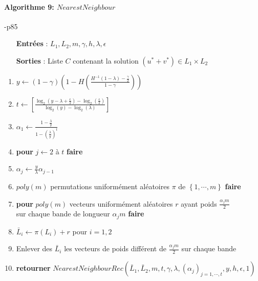 \documentclass[12pt,openany]{report}
\begin{document}
\begin{center}
\begin{boxedminipage}[ poslb ]{15cm}

\paragraph{Algorithme 9: $NearestNeighbour $ }\cite{Ghazal}-p85\\

\begin{itemize}
\item[\textbf{Entrées}]: $ L_1,L_2,m,\gamma,h,\lambda,\epsilon $
\item[\textbf{Sorties}]: Liste $ \mathit{C} $ contenant la solution $(u^{*}+ v^{*}) \in L_1 \times L_2  $
\end{itemize}

\begin{enumerate}
\item $ y \gets (1- \gamma)\left( 1- H \left( \frac{H^{-1}(1-\lambda)-\frac{\gamma}{2}}{1-\gamma}  \right) \right)   $

\item $ t \gets \left[ \frac{\log_2(y-\lambda+\frac{\epsilon}{2})-\log_2(\frac{\epsilon}{2})}{\log_2(y)-\log_2(\lambda)}   \right]  $
\item $ \alpha_1 \gets \frac{1-\frac{\lambda}{y}}{1-(\frac{\lambda}{y})^t}  $
\item \textbf{pour} $ j \gets 2 $ à $t$ \textbf{faire}
\item $ \alpha_j \gets \frac{y}{\lambda}\alpha_{j-1}  $
\item $ poly(m) $ permutations uniformément aléatoires  $ \pi $ de $ \left\lbrace  1,\cdots,m \right\rbrace  $ \textbf{faire}
\item \textbf{pour} $poly(m) $ vecteurs uniformément aléatoires $r$ ayant poids $  \frac{\alpha_j m}{2}$ \\ sur chaque bande de longueur $ \alpha_j m $ \textbf{faire}
\item $ \bar{L}_i \gets \pi(L_i)+r $ pour $ i=1,2 $
\item Enlever des $ \bar{L}_i $ les vecteurs de poids différent de $  \frac{\alpha_j m}{2}$ sur chaque bande
\item \textbf{retourner} $NearestNeighbourRec(\bar{L}_1,\bar{L}_2,m,t,\gamma,\lambda,(\alpha_j)_{j=1,\cdots,t},y,h,\epsilon,1)  $

\end{enumerate}


\end{boxedminipage}
\end{center}
\end{document}
